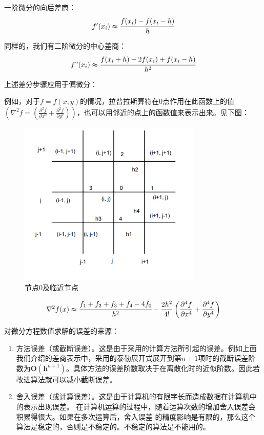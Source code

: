 \documentclass[12pt,a4paper]{article}
\begin{document}
一阶微分的向后差商：
\begin{equation}
f'(x_i)\thickapprox \cfrac {f(x_i)-f(x_i-h)}{h}
\end{equation}

同样的，我们有二阶微分的中心差商：
\begin{equation}
f"(x_i)\thickapprox \cfrac {f(x_i+h)-2f(x_i)+f(x_i-h)}{h^2}
\end{equation}

上述差分步骤应用于偏微分：

例如，对于$f=f(x,y)$的情况，拉普拉斯算符在0点作用在此函数上的值$\left(\nabla^{2} f=\left(\frac{\partial^{2} f}{\partial x^{2}}+\frac{\partial^{2} f}{\partial y^{2}}\right)\right)$，也可以用邻近的点上的函数值来表示出来。见下图：
\begin{figure}[H]
\centering
\includegraphics[scale=0.5]{./figures/figure-1.png}
\caption{节点0及临近节点}
\end{figure}


\begin{equation}
\nabla^2 f(x) \thickapprox \cfrac{f_1+f_2+f_3+f_4-4f_0}{h^2}-\frac{2 h^{2}}{4 !}\left(\frac{\partial^{4} f}{\partial x^{4}}+\frac{\partial^{4} f}{\partial y^{4}}\right)
\end{equation}

对微分方程数值求解的误差的来源：
\begin{enumerate}[(1)]
	\item 方法误差（或截断误差）。这是由于采用的计算方法所引起的误差。例如上面我们介绍的差商表示中，采用的泰勒展开式展开到第$n+1$项时的截断误差阶数为$\boldsymbol{O}\left(\boldsymbol{h}^{n+1}\right)$。具体方法的误差阶数取决于在离散化时的近似阶数。因此若改进算法就可以减小截断误差。
	\item 舍入误差（或计算误差）。这是由于计算机的有限字长而造成数据在计算机中的表示出现误差。
	在计算机运算的过程中，随着运算次数的增加舍入误差会积累得很大。如果在多次运算后，舍入误差
	的精度影响是有限的，那么这个算法是稳定的，否则是不稳定的。不稳定的算法是不能用的。 
\end{enumerate}
\end{document}
